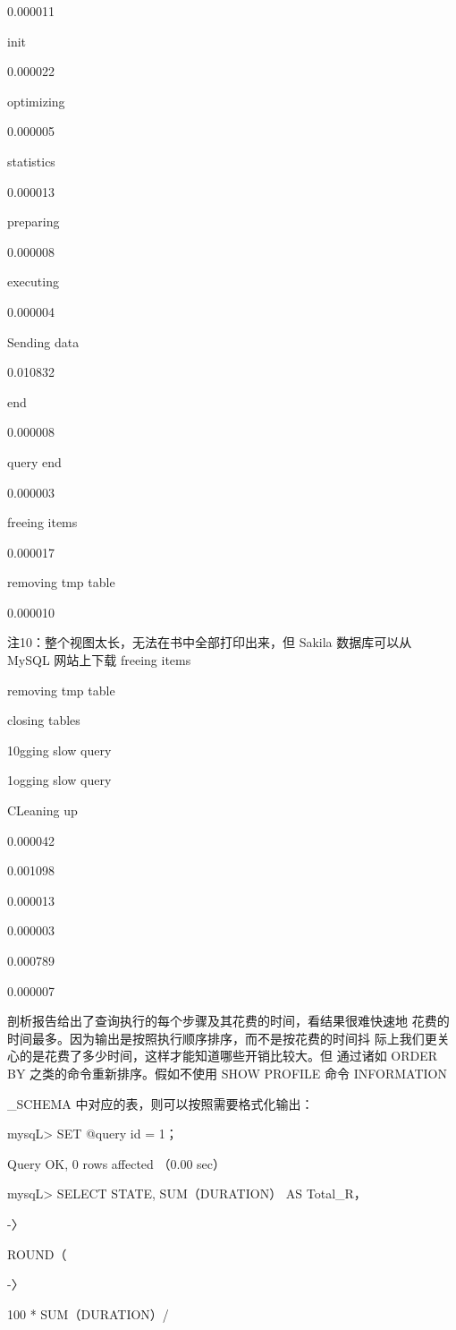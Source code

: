 {0.000011

init

0.000022

optimizing

0.000005

statistics

0.000013

preparing

0.000008

executing

0.000004

Sending data

0.010832

end

0.000008

query end

0.000003

freeing items

0.000017

removing tmp table

0.000010

注10：整个视图太长，无法在书中全部打印出来，但 Sakila 数据库可以从 MySQL 网站上下载
freeing items

removing tmp table

closing tables

10gging slow query

1ogging slow query

CLeaning up

0.000042

0.001098

0.000013

0.000003

0.000789

0.000007

剖析报告给出了查询执行的每个步骤及其花费的时间，看结果很难快速地
花费的时间最多。因为输出是按照执行顺序排序，而不是按花费的时间抖
际上我们更关心的是花费了多少时间，这样才能知道哪些开销比较大。但
通过诸如 ORDER BY 之类的命令重新排序。假如不使用 SHOW PROFILE 命令
INFORMATION

\_SCHEMA 中对应的表，则可以按照需要格式化输出：

mysqL> SET @query id = 1；

Query OK, 0 rows affected （0.00 sec）

mysqL> SELECT STATE, SUM（DURATION） AS Total\_R，

-〉

ROUND（

-〉

100 * SUM（DURATION）/

}
